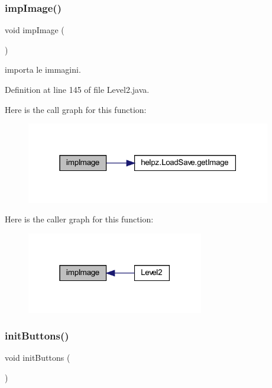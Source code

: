 \subsubsection{\texorpdfstring{imp\+Image()}{impImage()}}
{\footnotesize\ttfamily void imp\+Image (\begin{DoxyParamCaption}{ }\end{DoxyParamCaption})\hspace{0.3cm}{\ttfamily [private]}}



importa le immagini. 



Definition at line 145 of file Level2.\+java.

Here is the call graph for this function\+:\nopagebreak
\begin{figure}[H]
\begin{center}
\leavevmode
\includegraphics[width=303pt]{classscenes_1_1_level2_aded9c531b53772fd90d09a8b6bf0132e_cgraph}
\end{center}
\end{figure}
Here is the caller graph for this function\+:\nopagebreak
\begin{figure}[H]
\begin{center}
\leavevmode
\includegraphics[width=219pt]{classscenes_1_1_level2_aded9c531b53772fd90d09a8b6bf0132e_icgraph}
\end{center}
\end{figure}
\mbox{\label{classscenes_1_1_level2_a27d3ba5afb772cc36c9a432c28975ace}} 
\subsubsection{\texorpdfstring{init\+Buttons()}{initButtons()}}
{\footnotesize\ttfamily void init\+Buttons (\begin{DoxyParamCaption}{ }\end{DoxyParamCaption})\hspace{0.3cm}{\ttfamily [private]}}



